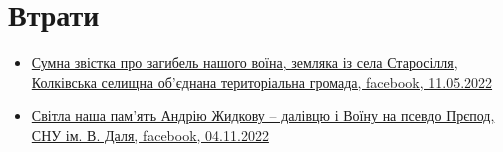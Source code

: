  
 
 
 
 
\section{Втрати}
\label{sec:topics.vojna.vtraty}






\begin{itemize} %

\item \hyperlink{11_05_2022.fb.kolky.rada.org.ua.1.smert_mosijchuk_ivan_ivanovich}{%
Сумна звістка про загибель нашого воїна, земляка із села Старосілля, %
Колківська селищна об'єднана територіальна громада, facebook, 11.05.2022%
}

\item \hyperlink{04_11_2022.fb.ua.edu.snu.1.andrij_zhidkov}{%
Світла наша пам'ять Андрію Жидкову – далівцю і Воїну на псевдо Прєпод,%
СНУ ім. В. Даля, facebook, 04.11.2022%
}

\end{itemize} %
